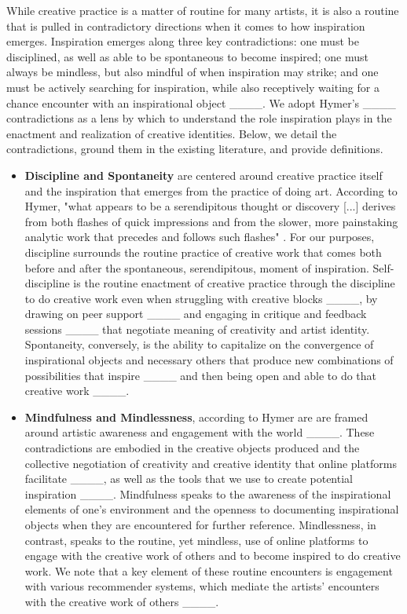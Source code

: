     While creative practice is a matter of routine for many artists, it is also a routine that is pulled in contradictory directions when it comes to how inspiration emerges. Inspiration emerges along three key contradictions: one must be disciplined, as well as able to be spontaneous to become inspired; one must always be mindless, but also mindful of when inspiration may strike; and one must be actively searching for inspiration, while also receptively waiting for a chance encounter with an inspirational object ____. We adopt Hymer's ____ contradictions as a lens by which to understand the role inspiration plays in the enactment and realization of creative identities. Below, we detail the contradictions, ground them in the existing literature, and provide definitions. 

\begin{itemize}

\item \textbf{Discipline and Spontaneity} are centered around creative practice itself and the inspiration that emerges from the practice of doing art. According to Hymer, "what appears to be a serendipitous thought or discovery [...] derives from both flashes of quick impressions and from the slower, more painstaking analytic work that precedes and follows such flashes" \cite[~p.30]{hymer1990inspiration}. For our purposes, discipline surrounds the routine practice of creative work that comes both before and after the spontaneous, serendipitous, moment of inspiration. Self-discipline is the routine enactment of creative practice through the discipline to do creative work even when struggling with creative blocks ____, by drawing on peer support ____ and engaging in critique and feedback sessions ____ that negotiate meaning of creativity and artist identity. Spontaneity, conversely, is the ability to capitalize on the convergence of inspirational objects and necessary others that produce new combinations of possibilities that inspire ____ and then being open and able to do that creative work ____. 

\item \textbf{Mindfulness and Mindlessness}, according to Hymer are are framed around artistic awareness and engagement with the world ____. These contradictions are embodied in the creative objects produced and the collective negotiation of creativity and creative identity that online platforms facilitate ____, as well as the tools that we use to create potential inspiration ____. Mindfulness speaks to the awareness of the inspirational elements of one’s environment and the openness to documenting inspirational objects when they are encountered for further reference. Mindlessness, in contrast, speaks to the routine, yet mindless, use of online platforms to engage with the creative work of others and to become inspired to do creative work. We note that a key element of these routine encounters is engagement with various recommender systems, which mediate the artists’ encounters with the creative work of others ____. 


\end{itemize}
